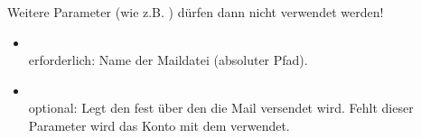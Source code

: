     Weitere Parameter (wie z.B. ) dürfen dann nicht verwendet werden!  

\begin {itemize}
  \item [\var{-m},]  
    \\erforderlich: Name der Maildatei (absoluter Pfad).
  
  \item [\var{-A},]  
    \\optional: Legt den 
    fest über den die Mail versendet wird. Fehlt dieser Parameter wird das
    Konto mit dem   verwendet.
\end{itemize}

